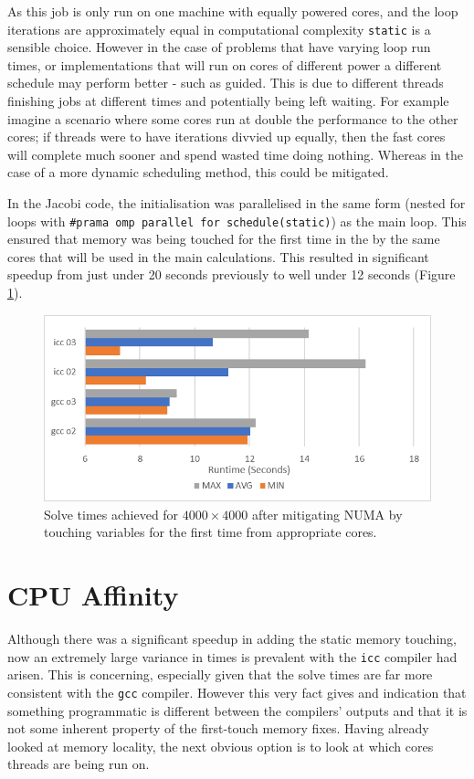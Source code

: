 \documentclass[11pt,twocolumn,a4paper]{article}
\begin{document}
As this job is only run on one machine with equally powered cores, and the loop iterations are approximately equal in computational complexity \texttt{static} is a sensible choice. However in the case of problems that have varying loop run times, or implementations that will run on cores of different power a different schedule may perform better - such as guided. This is due to different threads finishing jobs at different times and potentially being left waiting. For example imagine a scenario where some cores run at double the performance to the other cores; if threads were to have iterations divvied up equally, then the fast cores will complete much sooner and spend wasted time doing nothing. Whereas in the case of a more dynamic scheduling method, this could be mitigated. \par

In the Jacobi code, the initialisation was parallelised in the same form (nested for loops with \texttt{\#prama omp parallel for schedule(static)}) as the main loop. This ensured that memory was being touched for the first time in the by the same cores that will be used in the main calculations. This resulted in significant speedup from just under 20 seconds previously to well under 12 seconds (Figure \ref{fig-5-numa}).

\begin{figure}[h]
        \centering
        \includegraphics[width=0.8\linewidth]{figures/6-MEM-ALIGN-V2.png}
        \caption{Solve times achieved for $4000\times4000$ after mitigating NUMA by touching variables for the first time from appropriate cores.}
        \label{fig-5-numa}
\end{figure}


\section{CPU Affinity}
Although there was a significant speedup in adding the static memory touching, now an extremely large variance in times is prevalent with the \texttt{icc} compiler had arisen. This is concerning, especially given that the solve times are far more consistent with the \texttt{gcc} compiler. However this very fact gives and indication that something programmatic is different between the compilers' outputs and that it is not some inherent property of the first-touch memory fixes. Having already looked at memory locality, the next obvious option is to look at which cores threads are being run on. \par
\end{document}
